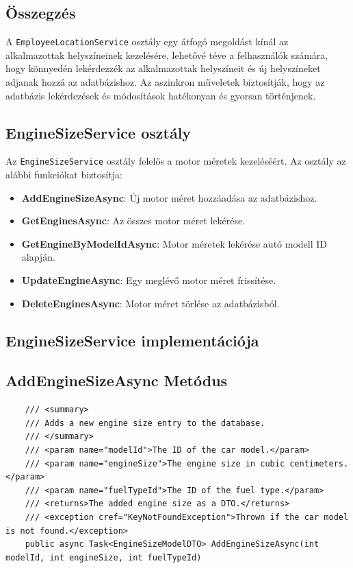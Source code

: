 \documentclass{report}[11pt]
\begin{document}
\subsection*{Összegzés}
A \texttt{EmployeeLocationService} osztály egy átfogó megoldást kínál az alkalmazottak helyszíneinek kezelésére, lehetővé téve a felhasználók számára, hogy könnyedén lekérdezzék az alkalmazottak helyszíneit és új helyszíneket adjanak hozzá az adatbázishoz. Az aszinkron műveletek biztosítják, hogy az adatbázis lekérdezések és módosítások hatékonyan és gyorsan történjenek.

\subsection{EngineSizeService osztály}

Az \texttt{EngineSizeService} osztály felelős a motor méretek kezeléséért. Az osztály az alábbi funkciókat biztosítja:

\begin{itemize}
    \item \textbf{AddEngineSizeAsync}: Új motor méret hozzáadása az adatbázishoz.
    \item \textbf{GetEnginesAsync}: Az összes motor méret lekérése.
    \item \textbf{GetEngineByModelIdAsync}: Motor méretek lekérése autó modell ID alapján.
    \item \textbf{UpdateEngineAsync}: Egy meglévő motor méret frissítése.
    \item \textbf{DeleteEnginesAsync}: Motor méret törlése az adatbázisból.
\end{itemize}

\subsection{EngineSizeService implementációja}

\subsection*{AddEngineSizeAsync Metódus}
\begin{lstlisting}
    /// <summary>
    /// Adds a new engine size entry to the database.
    /// </summary>
    /// <param name="modelId">The ID of the car model.</param>
    /// <param name="engineSize">The engine size in cubic centimeters.</param>
    /// <param name="fuelTypeId">The ID of the fuel type.</param>
    /// <returns>The added engine size as a DTO.</returns>
    /// <exception cref="KeyNotFoundException">Thrown if the car model is not found.</exception>
    public async Task<EngineSizeModelDTO> AddEngineSizeAsync(int modelId, int engineSize, int fuelTypeId)
\end{lstlisting}
\end{document}
